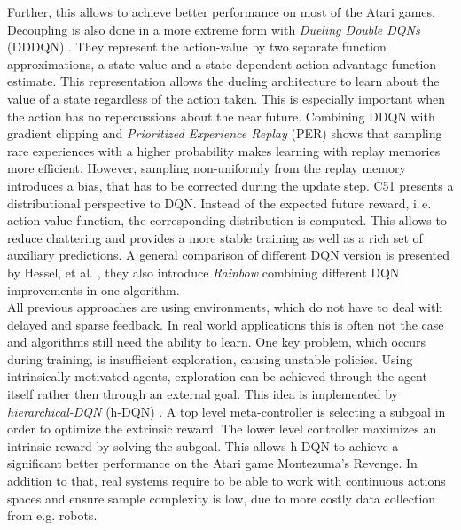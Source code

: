 	Further, this allows to achieve better performance on most of the Atari games. 
	Decoupling is also done in a more extreme form with \textit{Dueling Double DQNs} (DDDQN) \cite{Wang2016}. 
	They represent the action-value by two separate function approximations, a state-value and a state-dependent action-advantage function estimate.
	This representation allows the dueling architecture to learn about the value of a state regardless of the action taken. 
	This is especially important when the action has no repercussions about the near future. 
	Combining DDQN with gradient clipping and \textit{Prioritized Experience Replay} (PER) \cite{Schaul2015} shows that sampling rare experiences with a higher probability makes learning with replay memories more efficient. 
	However, sampling non-uniformly from the replay memory introduces a bias, that has to be corrected during the update step.
	C51 \cite{Bellemare2017} presents a distributional perspective to DQN.
	Instead of the expected future reward, i.\,e. action-value function, the corresponding distribution is computed. 
	This allows to reduce chattering and provides a more stable training as well as a rich set of auxiliary predictions.
	A general comparison of different DQN version is presented by Hessel, et al. \cite{Hessel2018}, they also introduce \textit{Rainbow} combining different DQN improvements in one algorithm.\\
	All previous approaches are using environments, which do not have to deal with delayed and sparse feedback.
	In real world applications this is often not the case and algorithms still need the ability to learn.
	One key problem, which occurs during training, is insufficient exploration, causing unstable policies. 
	Using intrinsically motivated agents, exploration can be achieved through the agent itself rather then through an external goal. 
	This idea is implemented by \textit{hierarchical-DQN} (h-DQN) \cite{Kulkarni2016}.
	A top level meta-controller is selecting a subgoal in order to optimize the extrinsic reward.
	The lower level controller maximizes an intrinsic reward by solving the subgoal.
	This allows h-DQN to achieve a significant better performance on the Atari game Montezuma's Revenge.
	In addition to that, real systems require to be able to work with continuous actions spaces and ensure sample complexity is low, due to more costly data collection from e.g. robots.
